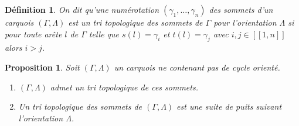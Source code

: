 \documentclass[a4paper,11pt]{article}
\newtheorem{defi}[thm]{Définition}%
\newtheorem{prop}[thm]{Proposition}%
\begin{document}
\begin{defi}
	On dit qu'une numérotation $(\gamma_{1}, \dots, \gamma_{n})$ des sommets d'un carquois $(\Gamma,\Lambda)$ est un \emph{tri topologique} des sommets de $\Gamma$ pour l'orientation $\Lambda$ si pour toute arête $l$ de $\Gamma$ telle que $s(l) = \gamma_{i}$ et $t(l) = \gamma_{j}$ avec  $i,j \in [\![1,n]\!]$ alors $i>j$.
\end{defi}
\begin{prop}
\label{tri-topo}
Soit $(\Gamma,\Lambda)$ un carquois ne contenant pas de cycle orienté.
  \begin{enumerate}
  \item $(\Gamma,\Lambda)$ admet un tri topologique de ces sommets.
  \item Un tri topologique des sommets de $(\Gamma,\Lambda)$ est une suite de puits suivant l'orientation $\Lambda$.
  \end{enumerate}
\end{prop}
\end{document}
